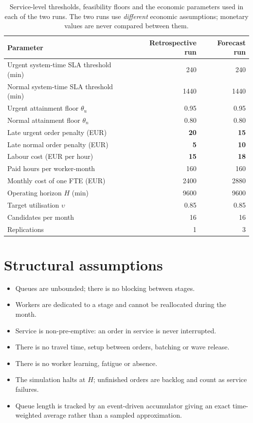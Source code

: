 \begin{table}[htbp]
\centering
\caption[Service-level and economic parameters]{Service-level thresholds, feasibility floors and
the economic parameters used in each of the two runs. The two runs use \emph{different}
economic assumptions; monetary values are never compared between them.}
\label{tab:sla-econ}
\small
\begin{tabularx}{\textwidth}{Xrr}
\toprule
\textbf{Parameter} & \textbf{Retrospective run} & \textbf{Forecast run} \\
\midrule
Urgent system-time SLA threshold (min) & 240 & 240 \\
Normal system-time SLA threshold (min) & \num{1440} & \num{1440} \\
Urgent attainment floor \(\theta_u\)  & 0.95 & 0.95 \\
Normal attainment floor \(\theta_n\)  & 0.80 & 0.80 \\
\midrule
Late urgent order penalty (EUR)       & \textbf{20} & \textbf{15} \\
Late normal order penalty (EUR)       & \textbf{5}  & \textbf{10} \\
Labour cost (EUR per hour)            & \textbf{15} & \textbf{18} \\
Paid hours per worker-month           & 160 & 160 \\
Monthly cost of one FTE (EUR)         & \num{2400} & \num{2880} \\
\midrule
Operating horizon \(H\) (min)         & \num{9600} & \num{9600} \\
Target utilisation \(\upsilon\)       & 0.85 & 0.85 \\
Candidates per month                  & 16 & 16 \\
Replications                          & 1 & 3 \\
\bottomrule
\end{tabularx}
\end{table}

\section{Structural assumptions}

\begin{itemize}
  \item Queues are unbounded; there is no blocking between stages.
  \item Workers are dedicated to a stage and cannot be reallocated during the month.
  \item Service is non-pre-emptive: an order in service is never interrupted.
  \item There is no travel time, setup between orders, batching or wave release.
  \item There is no worker learning, fatigue or absence.
  \item The simulation halts at \(H\); unfinished orders are backlog and count as service
        failures.
  \item Queue length is tracked by an event-driven accumulator giving an exact time-weighted
        average rather than a sampled approximation.
\end{itemize}

